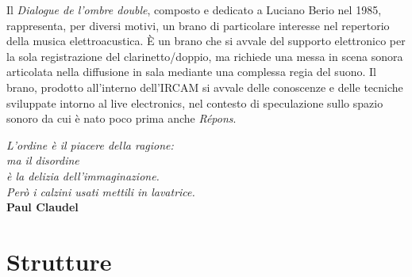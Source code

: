 
Il \emph{Dialogue de l'ombre double}, composto e dedicato a Luciano Berio nel 1985, rappresenta, per diversi motivi, un brano di particolare interesse nel repertorio della musica elettroacustica. È un brano che si avvale del supporto elettronico per la sola registrazione del clarinetto/doppio, ma richiede una messa in scena sonora articolata nella diffusione in sala mediante una complessa regia del suono. Il brano, prodotto all'interno dell'IRCAM si avvale delle conoscenze e delle tecniche sviluppate intorno al live electronics, nel contesto di speculazione sullo spazio sonoro da cui è nato poco prima anche \emph{Répons}.%

\clearpage

%
%

\begin{flushright}
{\small
\textit{ 
L'ordine è il piacere della ragione:\\ma il disordine\\ è la delizia dell'immaginazione.\\ Però i calzini usati mettili in lavatrice.\\
 }\textbf{Paul Claudel}}%
\end{flushright}


\section*{Strutture}



